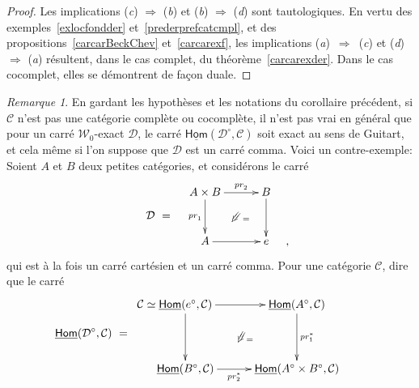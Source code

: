 \documentclass[francais]{smfart}
\theoremstyle{plain}
\theoremstyle{remark}
\newtheorem{rem}[thm]{Remarque}
\theoremstyle{definition}
\numberwithin{equation}{thm}
\begin{document}
\begin{proof}
Les implications (\emph{c}) $\Rightarrow$ (\emph{b}) et (\emph{b}) $\Rightarrow$ (\emph{d}) sont tautologiques. En vertu des exemples~\ref{exlocfondder} et~\ref{prederprefcatcmpl}, et des propositions~\ref{carcarBeckChev} et~\ref{carcarexf}, les implications  \hbox{(\emph{a}) $\Rightarrow$ (\emph{c})} et (\emph{d}) $\Rightarrow$ (\emph{a}) résultent, dans le cas complet, du théorème~\ref{carcarexder}. Dans le cas cocomplet, elles se démontrent de façon duale.
\end{proof}

\begin{rem}
En gardant les hypothèses et les notations du corollaire précédent, si ${\mathcal{C}}$ n'est pas une catégorie complète ou cocomplète, il n'est pas vrai en général que pour un carré ${{\mathcal{W}}_{0}}${\nobreakdash}-exact $\mathcal D$, le carré ${\operatorname{\underline{\mathsf{Hom}}}}({{{\mathcal D}}^{\circ}},{\mathcal{C}})$ soit exact au sens de Guitart, et cela même si l'on suppose que $\mathcal D$ est un carré comma. Voici un contre-exemple: Soient $A$ et $B$ deux petites catégories, et considérons le carré 
\[
{\mathcal{D}}\ =\quad
\raise 23pt
\vbox{
\UseTwocells
\xymatrixcolsep{2.5pc}
\xymatrixrowsep{2.4pc}
\xymatrix{
A\times B\ar[d]_{pr^{}_1}\ar[r]^-{pr^{}_2}
\drtwocell<\omit>{}
&B\ar[d]^{}\ar@<-2.7ex>@{}[d]_(.55){=}
\\
A\ar[r]_{}
&e\hskip 15pt,\hskip -18pt
}
}
\]
qui est à la fois un carré cartésien et un carré comma. Pour une catégorie ${\mathcal{C}}$, dire que le carré 
\[
{\operatorname{\underline{\mathsf{Hom}}}}{({{{\mathcal{D}}}^{\circ}},{\mathcal{C}})}\ =\hskip 20pt
\raise 28pt
\vbox{
\UseTwocells
\xymatrixcolsep{2.5pc}
\xymatrixrowsep{3.4pc}
\xymatrix{
\hskip -19pt{\mathcal{C}}\simeq{\operatorname{\underline{\mathsf{Hom}}}}{({{{e}}^{\circ}},{\mathcal{C}})}\ar[d]_{}\ar[r]^{}
\drtwocell<\omit>{}
&{\operatorname{\underline{\mathsf{Hom}}}}({{{A}}^{\circ}},{\mathcal{C}})\ar[d]^{pr_1^*}\ar@<-8.3ex>@{}[d]_(.55){=}
\\
{\operatorname{\underline{\mathsf{Hom}}}}{({{{B}}^{\circ}},{\mathcal{C}})}\ar[r]_-{pr_2^*}
&{\operatorname{\underline{\mathsf{Hom}}}}({{{A}}^{\circ}}\times{{{B}}^{\circ}},{\mathcal{C}})
}
}\qquad
\]

\end{rem}
\end{document}
